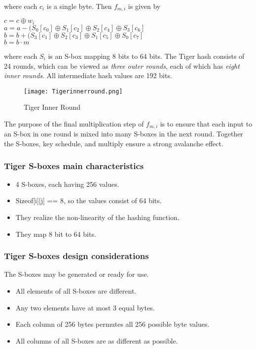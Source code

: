 \documentclass{article}
\begin{document}
where each $c_i$ is a single byte. Then $f_{m,i}$ is given by
\begin{center}
    $c = c \oplus w_i$\\
    $a = a - (S_0[c_0] \oplus S_1[c_2] \oplus S_2[c_4] \oplus S_3[c_6]$\\
    $b = b + (S_3[c_1] \oplus S_2[c_3] \oplus S_1[c_5] \oplus S_0[c_7]$\\
    $b = b \cdot m$
\end{center}
where each $S_i$ is an S-box mapping 8 bits to 64 bits. The Tiger hash consists of 24 rounds, which can be viewed as\textit{ three outer rounds}, each of which has \textit{eight inner rounds}. All intermediate hash values are 192 bits.
\begin{figure}[H]
    \centering
    \texttt{[image: Tigerinnerround.png]}
    \caption{Tiger Inner Round}
\end{figure}
The purpose of the final multiplication step of $f_{m,i}$ is to ensure that each input to an S-box in one round is mixed into many S-boxes in the next round. Together the S-boxes, key schedule, and multiply ensure a strong avalanche effect.
\newpage
\subsubsection{Tiger S-boxes main characteristics}
\begin{itemize}
    \item 4 S-boxes, each having 256 values.
    \item Sizeof[i][j] == 8, so the values consist of 64 bits.
    \item They realize the non-linearity of the hashing function.
    \item They map 8 bit to 64 bits.
\end{itemize}{}

\subsubsection{Tiger S-boxes design considerations}
The S-boxes may be generated or ready for use.
\begin{itemize}
    \item All elements of all S-boxes are different.
    \item Any two elements have at most 3 equal bytes.
    \item Each column of 256 bytes permutes all 256 possible byte values.
    \item All columns of all S-boxes are as different as possible.
\end{itemize}{}
\end{document}
